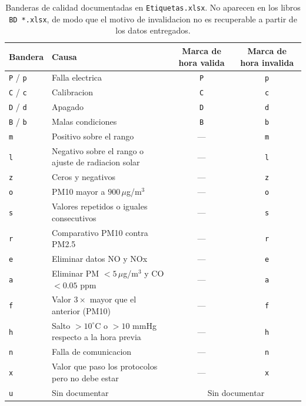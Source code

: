 \begin{table}[pos=t]
  \centering
  \caption{Banderas de calidad documentadas en \texttt{Etiquetas.xlsx}. No
    aparecen en los libros \texttt{BD *.xlsx}, de modo que el motivo de
    invalidacion no es recuperable a partir de los datos entregados.}
  \label{tab:dic-banderas}
  \small
  \begin{tabular}{llcc}
    \toprule
    Bandera & Causa & Marca de hora valida & Marca de hora invalida \\
    \midrule
    \texttt{P} / \texttt{p} & Falla electrica                                    & \texttt{P} & \texttt{p} \\
    \texttt{C} / \texttt{c} & Calibracion                                        & \texttt{C} & \texttt{c} \\
    \texttt{D} / \texttt{d} & Apagado                                            & \texttt{D} & \texttt{d} \\
    \texttt{B} / \texttt{b} & Malas condiciones                                  & \texttt{B} & \texttt{b} \\
    \texttt{m}              & Positivo sobre el rango                            & ---        & \texttt{m} \\
    \texttt{l}              & Negativo sobre el rango o ajuste de radiacion solar& ---        & \texttt{l} \\
    \texttt{z}              & Ceros y negativos                                  & ---        & \texttt{z} \\
    \texttt{o}              & PM10 mayor a $900\,\mu$g/m$^3$                     & ---        & \texttt{o} \\
    \texttt{s}              & Valores repetidos o iguales consecutivos           & ---        & \texttt{s} \\
    \texttt{r}              & Comparativo PM10 contra PM2.5                      & ---        & \texttt{r} \\
    \texttt{e}              & Eliminar datos NO y NOx                            & ---        & \texttt{e} \\
    \texttt{a}              & Eliminar PM $<5\,\mu$g/m$^3$ y CO $<0.05$ ppm      & ---        & \texttt{a} \\
    \texttt{f}              & Valor $3\times$ mayor que el anterior (PM10)       & ---        & \texttt{f} \\
    \texttt{h}              & Salto $>10^{\circ}$C o $>10$ mmHg respecto a la hora previa & --- & \texttt{h} \\
    \texttt{n}              & Falla de comunicacion                              & ---        & \texttt{n} \\
    \texttt{x}              & Valor que paso los protocolos pero no debe estar   & ---        & \texttt{x} \\
    \texttt{u}              & Sin documentar                                     & \multicolumn{2}{c}{Sin documentar} \\
    \bottomrule
  \end{tabular}
\end{table}

